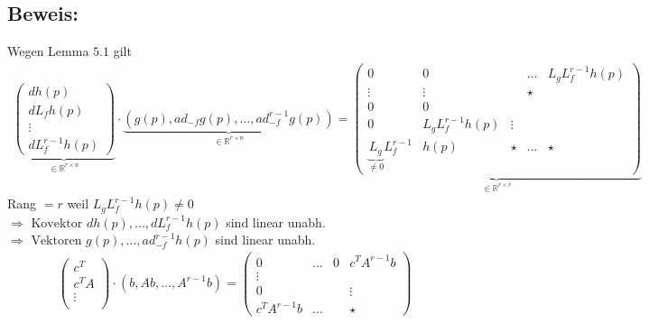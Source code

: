 \documentclass[ngerman]{tudscrreprt}
\begin{document}
\subsection*{Beweis:} Wegen Lemma $5.1$ gilt \begin{align}
\underbrace{\begin{pmatrix} dh(p)\\ dL_fh(p)\\ \vdots\\ dL_f^{r-1}h(p)\end{pmatrix}}_{\in \mathbb{R}^{r\times n}} \cdot \underbrace{\left( g(p) ,ad_{-f}g(p),\dots, ad_{-f}^{r-1}g(p) \right)}_{\in \mathbb{R}^{r\times n}} = 
\underbrace{\begin{pmatrix}
0      &    0   & & \dots & L_g L_f^{r-1} h(p)\\ 
\vdots & \vdots & & \star \\ 
0      &    0   & & \\ 
0      & L_gL_f^{r-1}h(p) & \vdots\\ 
\underbrace{L_g}_{\ne 0}L_f^{r-1}&h(p)&\star&\dots&\star
\end{pmatrix}}_{\in \mathbb{R}^{r\times r}}
\end{align} Rang $= r$ weil $ L_g L_f^{r-1} h(p) \ne 0 $\\ 
$\Rightarrow \text{ Kovektor } dh(p) ,\dots, dL_f^{r-1} h(p) $ sind linear unabh. \\ 
$\Rightarrow \text{ Vektoren } g(p),\dots, ad_{-f}^{r-1} h(p) $ sind linear unabh.
\begin{align*}
\begin{pmatrix} c^T\\ c^T A\\ \vdots\\ 
\end{pmatrix}\cdot 
\left( b,Ab,\dots,A^{r-1}b  \right) = \begin{pmatrix} 
0     & \dots& 0 & c^T A^{r-1} b\\ 
\vdots&      &   &  \\ 
0     &&&\vdots\\ 
c^TA^{r-1}b&\dots& &\star
\end{pmatrix}
\end{align*}
\end{document}
